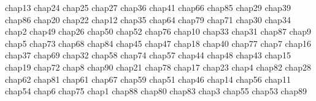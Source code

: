 \component chap13
\vfill
\page
\component chap24
\vfill
\component chap25
\vfill
\component chap27
\vfill
\component chap36
\vfill
\component chap41
\vfill
\page
\component chap66
\vfill
\component chap85
\vfill
\component chap29
\vfill
\component chap39
\vfill
\page
\component chap86
\vfill
\component chap20
\vfill
\component chap22
\vfill
\component chap12
\vfill
\page
\component chap35
\vfill
\component chap64
\vfill
\component chap79
\vfill
\page
\component chap71
\vfill
\component chap30
\vfill
\component chap34
\vfill
\page
\component chap2
\vfill
\component chap49
\vfill
\component chap26
\vfill
\page
\component chap50
\vfill
\component chap52
\vfill
\component chap76
\vfill
\page
\component chap10
\vfill
\component chap33
\vfill
\component chap31
\vfill
\page
\component chap87
\vfill
\component chap9
\vfill
\component chap5
\vfill
\page
\component chap73
\vfill
\component chap68
\vfill
\component chap84
\vfill
\page
\component chap45
\vfill
\component chap47
\vfill
\page
\component chap18
\vfill
\component chap40
\vfill
\page
\component chap77
\vfill
\component chap7
\vfill
\page
\component chap16
\vfill
\component chap37
\vfill
\page
\component chap69
\vfill
\component chap32
\vfill
\page
\component chap58
\vfill
\component chap74
\vfill
\page
\component chap57
\vfill
\component chap44
\vfill
\page
\component chap48
\vfill
\component chap43
\vfill
\page
\component chap15
\vfill
\component chap19
\vfill
\page
\component chap72
\vfill
\component chap8
\vfill
\page
\component chap90
\vfill
\component chap21
\vfill
\page
\component chap78
\vfill
\component chap17
\vfill
\page
\component chap23
\vfill
\component chap4
\vfill
\page
\component chap82
\vfill
\component chap28
\vfill
\page
\component chap62
\vfill
\component chap81
\vfill
\page
\component chap61
\vfill
\component chap67
\vfill
\page
\component chap59
\vfill
\component chap51
\vfill
\page
\component chap46
\vfill
\component chap14
\vfill
\page
\component chap56
\vfill
\component chap11
\vfill
\page
\component chap54
\vfill
\component chap6
\vfill
\page
\component chap75
\vfill
\component chap1
\vfill
\page
\component chap88
\vfill
\component chap80
\vfill
\page
\component chap83
\vfill
\component chap3
\vfill
\page
\component chap55
\vfill
\page
\component chap53
\vfill
\component chap89
\vfill
\page
